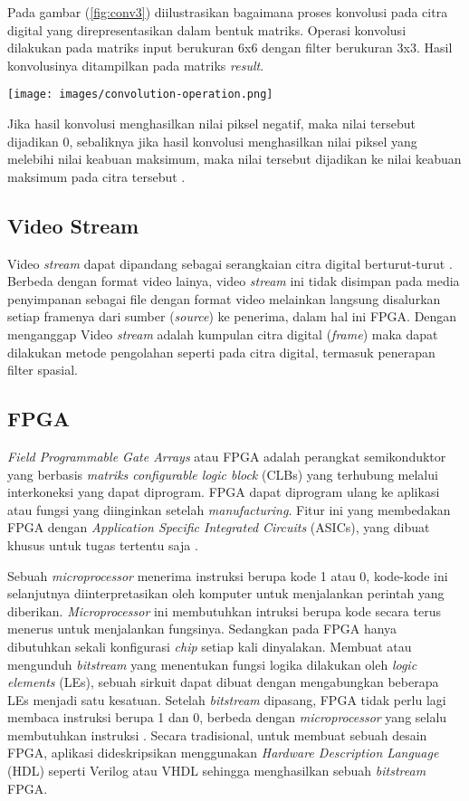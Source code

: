 Pada gambar (\ref{fig:conv3}) diilustrasikan bagaimana proses konvolusi pada citra digital yang direpresentasikan dalam bentuk matriks. Operasi konvolusi dilakukan pada matriks input berukuran 6x6 dengan filter berukuran 3x3. Hasil konvolusinya ditampilkan pada matriks \textit{result}.
\begin{figure*}[ht]
    \texttt{[image: images/convolution-operation.png]}
    \caption{Ilustrasi konvolusi pada citra.}
    \label{fig:conv3}
\end{figure*}

Jika hasil konvolusi menghasilkan nilai piksel negatif, maka nilai tersebut dijadikan 0, sebaliknya jika hasil konvolusi menghasilkan nilai piksel yang melebihi nilai keabuan maksimum, maka nilai tersebut dijadikan ke nilai keabuan maksimum pada citra tersebut \cite{book:sutoyo}.
 

\subsection{Video Stream}
Video \textit{stream} dapat dipandang sebagai serangkaian citra digital berturut-turut \cite{thesis:jin}. Berbeda dengan format video lainya, video \textit{stream} ini tidak disimpan pada media penyimpanan sebagai file dengan format video melainkan langsung disalurkan setiap framenya dari sumber (\textit{source}) ke penerima, dalam hal ini FPGA.  Dengan menganggap Video \textit{stream} adalah kumpulan citra digital (\textit{frame}) maka dapat dilakukan metode pengolahan seperti pada citra digital, termasuk penerapan filter spasial. 


\subsection{FPGA}
\textit{Field Programmable Gate Arrays} atau FPGA adalah perangkat semikonduktor yang berbasis \textit{matriks configurable logic block} (CLBs) yang terhubung melalui interkoneksi yang dapat diprogram. FPGA dapat diprogram ulang ke aplikasi atau fungsi yang diinginkan setelah \textit{manufacturing}. Fitur ini yang membedakan FPGA dengan \textit{Application Specific Integrated Circuits} (ASICs), yang dibuat khusus untuk tugas tertentu saja \cite{XILINX}.

Sebuah \textit{microprocessor} menerima instruksi berupa kode 1 atau 0, kode-kode ini selanjutnya diinterpretasikan oleh komputer untuk menjalankan perintah yang diberikan. \textit{Microprocessor} ini membutuhkan intruksi berupa kode secara terus menerus untuk menjalankan fungsinya. Sedangkan pada FPGA hanya dibutuhkan sekali konfigurasi \textit{chip} setiap kali dinyalakan. Membuat atau mengunduh \textit{bitstream} yang menentukan fungsi logika dilakukan oleh \textit{logic elements} (LEs), sebuah sirkuit dapat dibuat dengan mengabungkan beberapa LEs menjadi satu kesatuan. Setelah \textit{bitstream} dipasang, FPGA tidak perlu lagi membaca instruksi berupa 1 dan 0, berbeda dengan \textit{microprocessor} yang selalu membutuhkan instruksi \cite{pdf:cheung}. Secara tradisional, untuk membuat sebuah desain FPGA, aplikasi dideskripsikan menggunakan \textit{Hardware Description Language} (HDL) seperti Verilog atau VHDL sehingga menghasilkan sebuah \textit{bitstream} FPGA. 

